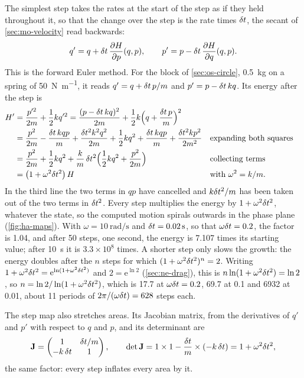 The simplest step takes the rates at the start of the step as if they held throughout it, so that the change over the step is the
rate times $\delta t$, the secant of \cref{sec:mo-velocity} read backwards:
\begin{equation*}
   q' = q + \delta t\,\frac{\partial H}{\partial p}(q, p) , \qquad
   p' = p - \delta t\,\frac{\partial H}{\partial q}(q, p) .
\end{equation*}
This is the forward Euler method. For the block of \cref{sec:os-circle},
\SI{0.5}{\kilogram} on a spring of \SI{50}{\newton\per\metre}, it reads
$q' = q + \delta t\,p/m$ and $p' = p - \delta t\,kq$. Its energy after the step is
\begin{align*}
   H' &= \frac{p'^2}{2m} + \frac12 kq'^2
   = \frac{(p - \delta t\,kq)^2}{2m} + \frac12 k\Bigl(q + \frac{\delta t\,p}{m}
   \Bigr)^2\\
   &= \frac{p^2}{2m} - \frac{\delta t\,kqp}{m} + \frac{\delta t^2k^2q^2}{2m}
   + \frac12 kq^2 + \frac{\delta t\,kqp}{m} + \frac{\delta t^2kp^2}{2m^2}
   && \text{expanding both squares}\\
   &= \frac{p^2}{2m} + \frac12 kq^2
   + \frac{k}{m}\,\delta t^2\Bigl(\frac12 kq^2 + \frac{p^2}{2m}\Bigr)
   && \text{collecting terms}\\
   &= \bigl(1 + \omega^2\delta t^2\bigr)\,H
   && \text{with $\omega^2 = k/m$.}
\end{align*}
In the third line the two terms in $qp$ have cancelled and $k\delta t^2/m$ has
been taken out of the two terms in $\delta t^2$. Every step multiplies the
energy by $1 + \omega^2\delta t^2$, whatever the state, so the computed motion spirals outwards in the phase plane
(\cref{fig:ha-maps}). With $\omega = \SI{10}{\radian\per\second}$ and $\delta t
= \SI{0.02}{\second}$, so that $\omega\delta t = 0.2$, the factor is 1.04, and
after 50 steps, one second, the energy is 7.107 times its starting value;
after \SI{10}{\second} it is $3.3\times10^8$ times. A shorter step only
slows the growth: the energy doubles after the $n$ steps for which $(1 +
\omega^2\delta t^2)^n = 2$. Writing $1 + \omega^2\delta t^2 = \mathrm{e}^{\ln(1 +
\omega^2\delta t^2)}$ and $2 = \mathrm{e}^{\ln 2}$ (\cref{sec:ne-drag}), this
is $n\ln(1 + \omega^2\delta t^2) = \ln 2$, so $n = \ln 2/\ln(1 +
\omega^2\delta t^2)$, which is 17.7 at $\omega\delta t = 0.2$, 69.7 at 0.1 and 6932
at 0.01, about 11 periods of $2\pi/(\omega\delta t) = 628$ steps each.

The step map also stretches areas. Its Jacobian matrix, from the
derivatives of $q'$ and $p'$ with respect to $q$ and $p$, and its
determinant are
\begin{equation*}
   \bm{\mathrm{J}} = \begin{pmatrix} 1 & \delta t/m\\ -k\,\delta t & 1 \end{pmatrix} ,
   \qquad
   \det\bm{\mathrm{J}} = 1\times1 - \frac{\delta t}{m}\times(-k\,\delta t)
   = 1 + \omega^2\delta t^2 ,
\end{equation*}
the same factor: every step inflates every area by it.

